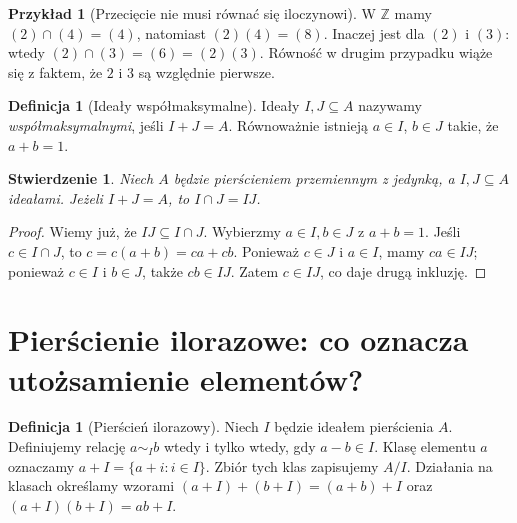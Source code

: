 \documentclass[11pt,a4paper,openany]{report}
\numberwithin{equation}{section}
\theoremstyle{plain}
\newtheorem{stwierdzenie}[twierdzenie]{Stwierdzenie}
\theoremstyle{definition}
\newtheorem{definicja}[twierdzenie]{Definicja}
\newtheorem{przyklad}[twierdzenie]{Przykład}
\theoremstyle{remark}
\newcommand{\Z}{\mathbb Z}
\begin{document}
\begin{przyklad}[Przecięcie nie musi równać się iloczynowi]
W $\Z$ mamy $(2)\cap(4)=(4)$, natomiast $(2)(4)=(8)$.
Inaczej jest dla $(2)$ i $(3)$: wtedy
$(2)\cap(3)=(6)=(2)(3)$. Równość w drugim przypadku wiąże się
z faktem, że $2$ i $3$ są względnie pierwsze.
\end{przyklad}

\begin{definicja}[Ideały współmaksymalne]
Ideały $I,J\subseteq A$ nazywamy \emph{współmaksymalnymi}, jeśli
$I+J=A$. Równoważnie istnieją $a\in I$, $b\in J$ takie, że $a+b=1$.
\end{definicja}

\begin{stwierdzenie}
Niech $A$ będzie pierścieniem przemiennym z jedynką, a $I,J\subseteq A$ ideałami.
Jeżeli $I+J=A$, to $I\cap J=IJ$.
\end{stwierdzenie}
\begin{proof}
Wiemy już, że $IJ\subseteq I\cap J$.
Wybierzmy $a\in I,b\in J$ z $a+b=1$. Jeśli $c\in I\cap J$,
to $c=c(a+b)=ca+cb$. Ponieważ $c\in J$ i $a\in I$,
mamy $ca\in IJ$; ponieważ $c\in I$ i $b\in J$,
także $cb\in IJ$. Zatem $c\in IJ$, co daje drugą inkluzję.
\end{proof}

\section{Pierścienie ilorazowe: co oznacza utożsamienie elementów?}

\begin{definicja}[Pierścień ilorazowy]
Niech $I$ będzie ideałem pierścienia $A$. Definiujemy relację
$a\sim_Ib$ wtedy i tylko wtedy, gdy $a-b\in I$.
Klasę elementu $a$ oznaczamy $a+I=\{a+i:i\in I\}$.
Zbiór tych klas zapisujemy $A/I$.
Działania na klasach określamy wzorami
$(a+I)+(b+I)=(a+b)+I$ oraz $(a+I)(b+I)=ab+I$.
\end{definicja}
\end{document}
